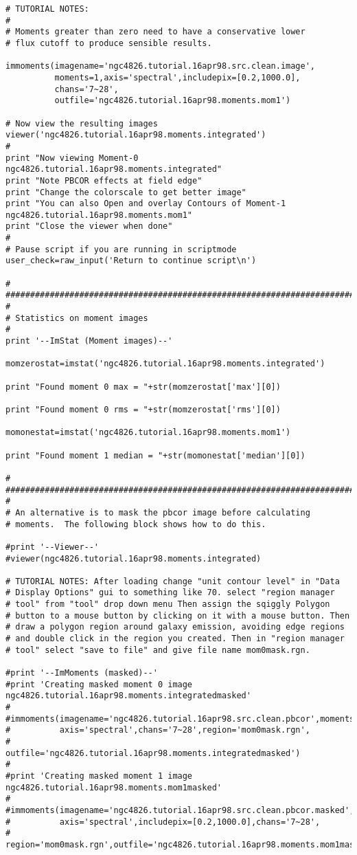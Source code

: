 \begin{verbatim}
# TUTORIAL NOTES:
#
# Moments greater than zero need to have a conservative lower
# flux cutoff to produce sensible results.

immoments(imagename='ngc4826.tutorial.16apr98.src.clean.image',
          moments=1,axis='spectral',includepix=[0.2,1000.0],
          chans='7~28',
          outfile='ngc4826.tutorial.16apr98.moments.mom1') 

# Now view the resulting images
viewer('ngc4826.tutorial.16apr98.moments.integrated')
#
print "Now viewing Moment-0 ngc4826.tutorial.16apr98.moments.integrated"
print "Note PBCOR effects at field edge"
print "Change the colorscale to get better image"
print "You can also Open and overlay Contours of Moment-1 ngc4826.tutorial.16apr98.moments.mom1"
print "Close the viewer when done"
#
# Pause script if you are running in scriptmode
user_check=raw_input('Return to continue script\n')

#
##########################################################################
#
# Statistics on moment images
#
print '--ImStat (Moment images)--'

momzerostat=imstat('ngc4826.tutorial.16apr98.moments.integrated')

print "Found moment 0 max = "+str(momzerostat['max'][0])

print "Found moment 0 rms = "+str(momzerostat['rms'][0])

momonestat=imstat('ngc4826.tutorial.16apr98.moments.mom1')

print "Found moment 1 median = "+str(momonestat['median'][0])

#
##########################################################################
#
# An alternative is to mask the pbcor image before calculating
# moments.  The following block shows how to do this.

#print '--Viewer--'
#viewer(ngc4826.tutorial.16apr98.moments.integrated)

# TUTORIAL NOTES: After loading change "unit contour level" in "Data
# Display Options" gui to something like 70. select "region manager
# tool" from "tool" drop down menu Then assign the sqiggly Polygon
# button to a mouse button by clicking on it with a mouse button. Then
# draw a polygon region around galaxy emission, avoiding edge regions
# and double click in the region you created. Then in "region manager
# tool" select "save to file" and give file name mom0mask.rgn.

#print '--ImMoments (masked)--'
#print 'Creating masked moment 0 image ngc4826.tutorial.16apr98.moments.integratedmasked'
#       
#immoments(imagename='ngc4826.tutorial.16apr98.src.clean.pbcor',moments=0,
#          axis='spectral',chans='7~28',region='mom0mask.rgn',
#          outfile='ngc4826.tutorial.16apr98.moments.integratedmasked') 
#
#print 'Creating masked moment 1 image ngc4826.tutorial.16apr98.moments.mom1masked'
#
#immoments(imagename='ngc4826.tutorial.16apr98.src.clean.pbcor.masked',moments=1,
#          axis='spectral',includepix=[0.2,1000.0],chans='7~28',
#          region='mom0mask.rgn',outfile='ngc4826.tutorial.16apr98.moments.mom1masked') 


\end{verbatim}
